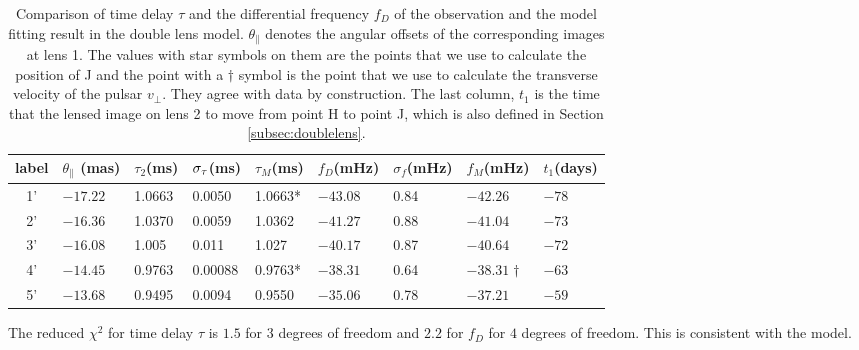 \documentclass[useAMS,usenatbib]{mn2e}
\begin{document}
\begin{table}
\centering
\begin{tabular}{c|llllllll}
\hline
label&$\theta_{\parallel}$ (mas)  & $\tau_2$(ms) & $\sigma_{\rm \tau}$(ms)  & $\tau_M$(ms) & $f_D$(mHz)  &$\sigma_{f}$(mHz)      &  $f_M$(mHz)& $t_1$(days) \\ \hline
1'& $-17.22$  &  1.0663     &0.0050    & 1.0663*        & $-43.08$    &0.84   & $-42.26$           & $-78$\\
 2'& $-16.36$  &    1.0370     &0.0059    & 1.0362       & $-41.27$    & 0.88   & $-41.04$          & $-73$\\ 
3'& $-16.08$  &   1.005    &0.011   & 1.027          & $-40.17$    &   0.87     & $-40.64$          & $-72$\\ 
 4'& $-14.45$  &   0.9763    &0.00088   & 0.9763*       & $-38.31$     &0.64    & $-38.31\dagger$  & $-63$\\ 
5'& $-13.68$  &    0.9495     &0.0094    & 0.9550       & $-35.06$     &0.78    & $-37.21$          &$-59$\\ 
 \hline
\end{tabular}
\caption{Comparison of time delay $\tau$ and the differential
  frequency $f_D$ of the observation and the model fitting result in the
  double lens model. $\theta_{\parallel}$ denotes the angular offsets
  of the corresponding images at lens 1. 
The values with star symbols on them are the points that we use to
calculate the position of J and the point with a $\dagger$ symbol is
the point that we use to calculate the transverse velocity of the pulsar $v_{\bot}$.  They agree with data by construction. The last column, $t_1$ is the time that the lensed image on lens 2 to move from point H to point J, which is also defined in Section \ref{subsec:doublelens}.}
\label{table:double_lens_compare}
\end{table}

The reduced ${\chi}^2$ for time delay $\tau$ is $1.5$
for $3$ degrees of freedom
and $2.2$ for $f_D$ for $4$ degrees of freedom.  This is consistent with the model.

\end{document}
